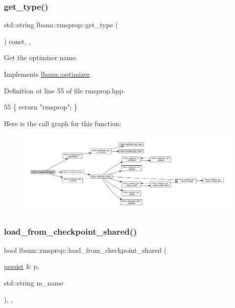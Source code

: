 \subsubsection{\texorpdfstring{get\+\_\+type()}{get\_type()}}
{\footnotesize\ttfamily std\+::string lbann\+::rmsprop\+::get\+\_\+type (\begin{DoxyParamCaption}{ }\end{DoxyParamCaption}) const\hspace{0.3cm}{\ttfamily [inline]}, {\ttfamily [override]}, {\ttfamily [virtual]}}

Get the optimizer name. 

Implements \hyperlink{classlbann_1_1optimizer_a7b7a6814e14eeee157e1cbb7f15dd4ff}{lbann\+::optimizer}.



Definition at line 55 of file rmsprop.\+hpp.


\begin{DoxyCode}
55 \{ \textcolor{keywordflow}{return} \textcolor{stringliteral}{"rmsprop"}; \}
\end{DoxyCode}
Here is the call graph for this function\+:\nopagebreak
\begin{figure}[H]
\begin{center}
\leavevmode
\includegraphics[width=350pt]{classlbann_1_1rmsprop_aa4299a19c0ab81a41ccebb9486f106b6_cgraph}
\end{center}
\end{figure}
\mbox{\label{classlbann_1_1rmsprop_a64db08f787ca8904a0ba4ecc37d5d1ed}} 
\subsubsection{\texorpdfstring{load\+\_\+from\+\_\+checkpoint\+\_\+shared()}{load\_from\_checkpoint\_shared()}}
{\footnotesize\ttfamily bool lbann\+::rmsprop\+::load\+\_\+from\+\_\+checkpoint\+\_\+shared (\begin{DoxyParamCaption}\item[{\hyperlink{classlbann_1_1persist}{persist} \&}]{p,  }\item[{std\+::string}]{m\+\_\+name }\end{DoxyParamCaption})\hspace{0.3cm}{\ttfamily [override]}, {\ttfamily [private]}, {\ttfamily [virtual]}}



